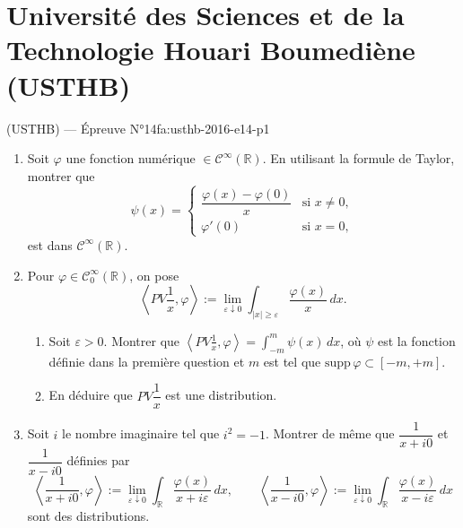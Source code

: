 \section{Université des Sciences et de la Technologie Houari Boumediène (USTHB)}
\begin{problem}{(USTHB) — Épreuve N°14}{fa:usthb-2016-e14-p1}
\begin{enumerate}\item Soit $\varphi$ une fonction numérique $\in\mathcal{C}^{\infty}(\mathbb{R})$. En utilisant la formule de Taylor, montrer que
$$\psi(x)=\begin{cases}\dfrac{\varphi(x)-\varphi(0)}{x} & \text{si } x\neq0,\\[2mm] \varphi'(0) & \text{si } x=0,\end{cases}$$
est dans $\mathcal{C}^{\infty}(\mathbb{R})$.
\item Pour $\varphi\in\mathcal{C}_0^{\infty}(\mathbb{R})$, on pose
$$\left\langle PV\frac{1}{x},\varphi\right\rangle:=\lim_{\varepsilon\downarrow0}\int_{|x|\geq\varepsilon}\frac{\varphi(x)}{x}\,dx.$$
\begin{enumerate}\item Soit $\varepsilon>0$. Montrer que $\left\langle PV\frac{1}{x},\varphi\right\rangle=\int_{-m}^{m}\psi(x)\,dx$, où $\psi$ est la fonction définie dans la première question et $m$ est tel que $\mathrm{supp}\,\varphi\subset[-m,+m]$.\item En déduire que $PV\dfrac{1}{x}$ est une distribution.\end{enumerate}
\item Soit $i$ le nombre imaginaire tel que $i^2=-1$. Montrer de même que $\dfrac{1}{x+i0}$ et $\dfrac{1}{x-i0}$ définies par
$$\left\langle\frac{1}{x+i0},\varphi\right\rangle:=\lim_{\varepsilon\downarrow0}\int_{\mathbb{R}}\frac{\varphi(x)}{x+i\varepsilon}\,dx,\qquad\left\langle\frac{1}{x-i0},\varphi\right\rangle:=\lim_{\varepsilon\downarrow0}\int_{\mathbb{R}}\frac{\varphi(x)}{x-i\varepsilon}\,dx$$
sont des distributions.\end{enumerate}
\end{problem}
\newpage
